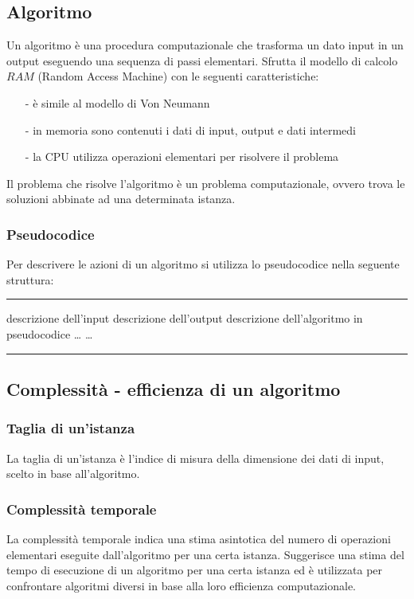 \documentclass[a4paper]{article}
\makeatletter
\newenvironment{algo}[4]{
	\noindent\rule{\textwidth}{0.4pt}
	\begin{algorithmic}[1]
		\addtocounter{ALG@line}{-1}
		\Procedure{#1}{#2}
		\Require #3
		\Ensure #4
		\Statex }{
		\EndProcedure
	\end{algorithmic}
	\rule{\textwidth}{0.4pt}}
\makeatother
\begin{document}
\subsection{Algoritmo}
Un algoritmo è una procedura computazionale che trasforma un dato input in un output eseguendo una sequenza di passi elementari.
Sfrutta il modello di calcolo \(RAM\) (Random Access Machine) con le seguenti caratteristiche:
\begin{itemize}[topsep=3pt, itemsep=0pt]
	\item[-] è simile al modello di Von Neumann
	\item[-] in memoria sono contenuti i dati di input, output e dati intermedi
	\item[-] la CPU utilizza operazioni elementari per risolvere il problema
\end{itemize}
Il problema che risolve l'algoritmo è un problema computazionale, ovvero trova le soluzioni abbinate ad una determinata istanza.

\subsubsection*{Pseudocodice}
Per descrivere le azioni di un algoritmo si utilizza lo pseudocodice nella seguente struttura:

\begin{algo}{MyAlgoritm}{parametri}{descrizione dell'input}{descrizione dell'output}
	\State descrizione dell'algoritmo in pseudocodice
	\State \dots
	\State \dots
\end{algo}

\subsection{Complessità - efficienza di un algoritmo}
\subsubsection*{Taglia di un'istanza}
La taglia di un'istanza è l'indice di misura della dimensione dei dati di input, scelto in base all'algoritmo.

\subsubsection*{Complessità temporale}
La complessità temporale indica una stima asintotica del numero di operazioni elementari eseguite dall'algoritmo per una certa
istanza. Suggerisce una stima del tempo di esecuzione di un algoritmo per una certa istanza ed è utilizzata per confrontare
algoritmi diversi in base alla loro efficienza computazionale.
\end{document}
